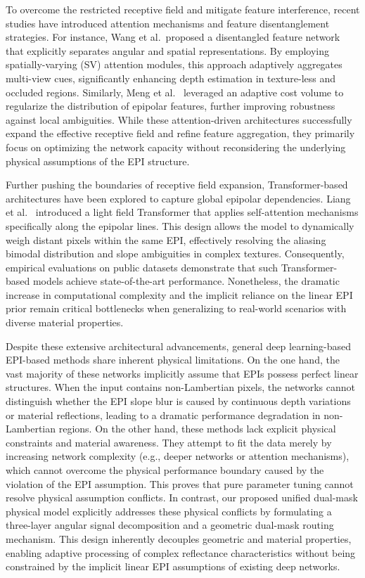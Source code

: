 \documentclass[lettersize,journal]{IEEEtran}
\begin{document}
To overcome the restricted receptive field and mitigate feature interference, recent studies have introduced attention mechanisms and feature disentanglement strategies. For instance, Wang et al.\ proposed a disentangled feature network that explicitly separates angular and spatial representations. By employing spatially-varying (SV) attention modules, this approach adaptively aggregates multi-view cues, significantly enhancing depth estimation in texture-less and occluded regions. Similarly, Meng et al.\ \cite{20} leveraged an adaptive cost volume to regularize the distribution of epipolar features, further improving robustness against local ambiguities. While these attention-driven architectures successfully expand the effective receptive field and refine feature aggregation, they primarily focus on optimizing the network capacity without reconsidering the underlying physical assumptions of the EPI structure.

Further pushing the boundaries of receptive field expansion, Transformer-based architectures have been explored to capture global epipolar dependencies. Liang et al.\ \cite{21} introduced a light field Transformer that applies self-attention mechanisms specifically along the epipolar lines. This design allows the model to dynamically weigh distant pixels within the same EPI, effectively resolving the aliasing bimodal distribution and slope ambiguities in complex textures. Consequently, empirical evaluations on public datasets demonstrate that such Transformer-based models achieve state-of-the-art performance. Nonetheless, the dramatic increase in computational complexity and the implicit reliance on the linear EPI prior remain critical bottlenecks when generalizing to real-world scenarios with diverse material properties.

Despite these extensive architectural advancements, general deep learning-based EPI-based methods share inherent physical limitations. On the one hand, the vast majority of these networks implicitly assume that EPIs possess perfect linear structures. When the input contains non-Lambertian pixels, the networks cannot distinguish whether the EPI slope blur is caused by continuous depth variations or material reflections, leading to a dramatic performance degradation in non-Lambertian regions. On the other hand, these methods lack explicit physical constraints and material awareness. They attempt to fit the data merely by increasing network complexity (e.g., deeper networks or attention mechanisms), which cannot overcome the physical performance boundary caused by the violation of the EPI assumption. This proves that pure parameter tuning cannot resolve physical assumption conflicts. In contrast, our proposed unified dual-mask physical model explicitly addresses these physical conflicts by formulating a three-layer angular signal decomposition and a geometric dual-mask routing mechanism. This design inherently decouples geometric and material properties, enabling adaptive processing of complex reflectance characteristics without being constrained by the implicit linear EPI assumptions of existing deep networks.
\end{document}
